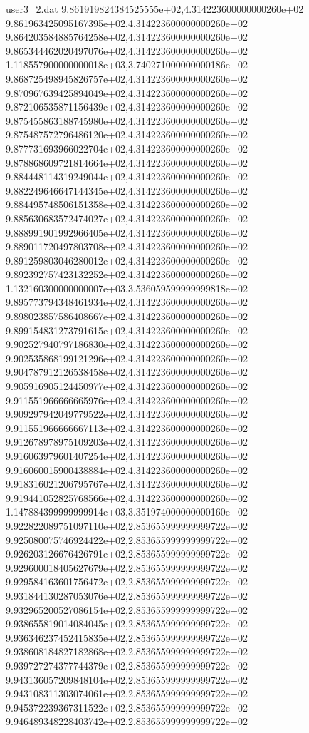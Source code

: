 \begin{filecontents}{user3_2.dat}
9.861919824384525555e+02,4.314223600000000260e+02
9.861963425095167395e+02,4.314223600000000260e+02
9.864203584885764258e+02,4.314223600000000260e+02
9.865344462020497076e+02,4.314223600000000260e+02
1.118557900000000018e+03,3.740271000000000186e+02
9.868725498945826757e+02,4.314223600000000260e+02
9.870967639425894049e+02,4.314223600000000260e+02
9.872106535871156439e+02,4.314223600000000260e+02
9.875455863188745980e+02,4.314223600000000260e+02
9.875487572796486120e+02,4.314223600000000260e+02
9.877731693966022704e+02,4.314223600000000260e+02
9.878868609721814664e+02,4.314223600000000260e+02
9.884448114319249044e+02,4.314223600000000260e+02
9.882249646647144345e+02,4.314223600000000260e+02
9.884495748506151358e+02,4.314223600000000260e+02
9.885630683572474027e+02,4.314223600000000260e+02
9.888991901992966405e+02,4.314223600000000260e+02
9.889011720497803708e+02,4.314223600000000260e+02
9.891259803046280012e+02,4.314223600000000260e+02
9.892392757423132252e+02,4.314223600000000260e+02
1.132160300000000007e+03,3.536059599999999818e+02
9.895773794348461934e+02,4.314223600000000260e+02
9.898023857586408667e+02,4.314223600000000260e+02
9.899154831273791615e+02,4.314223600000000260e+02
9.902527940797186830e+02,4.314223600000000260e+02
9.902535868199121296e+02,4.314223600000000260e+02
9.904787912126538458e+02,4.314223600000000260e+02
9.905916905124450977e+02,4.314223600000000260e+02
9.911551966666665976e+02,4.314223600000000260e+02
9.909297942049779522e+02,4.314223600000000260e+02
9.911551966666667113e+02,4.314223600000000260e+02
9.912678978975109203e+02,4.314223600000000260e+02
9.916063979601407254e+02,4.314223600000000260e+02
9.916060015900438884e+02,4.314223600000000260e+02
9.918316021206795767e+02,4.314223600000000260e+02
9.919441052825768566e+02,4.314223600000000260e+02
1.147884399999999914e+03,3.351974000000000160e+02
9.922822089751097110e+02,2.853655999999999722e+02
9.925080075746924422e+02,2.853655999999999722e+02
9.926203126676426791e+02,2.853655999999999722e+02
9.929600018405627679e+02,2.853655999999999722e+02
9.929584163601756472e+02,2.853655999999999722e+02
9.931844130287053076e+02,2.853655999999999722e+02
9.932965200527086154e+02,2.853655999999999722e+02
9.938655819014084045e+02,2.853655999999999722e+02
9.936346237452415835e+02,2.853655999999999722e+02
9.938608184827182868e+02,2.853655999999999722e+02
9.939727274377744379e+02,2.853655999999999722e+02
9.943136057209848104e+02,2.853655999999999722e+02
9.943108311303074061e+02,2.853655999999999722e+02
9.945372239367311522e+02,2.853655999999999722e+02
9.946489348228403742e+02,2.853655999999999722e+02

\end{filecontents}
